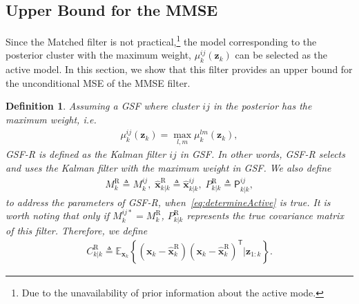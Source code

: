\documentclass[10pt,twocolumn,twoside]{IEEEtran}
\newtheorem{Def}{Definition}
\newcommand{\tran}{^{\mathsf{T}}}
\newcommand{\expectx}{\mathds{E}_{\mathbf{x}_k}\!}
\newcommand{\corcol}[1]{\textcolor{CorCol}{#1}}
\begin{document}
 
\subsection{Upper Bound for the MMSE}
\label{sec:UB}
Since the Matched filter is not practical,\footnote{Due to the unavailability of prior information about the active mode.} the model corresponding to the posterior cluster with the maximum weight, \(\mu_k^{ij}{\left(\mathbf{z}_{k}\right)}\) can be selected as the active model. In this section, we show that this filter provides an upper bound for the unconditional MSE of the MMSE filter.

\begin{Def}
\label{def:UBFilter}
Assuming a GSF where cluster \(ij\) in the posterior has the maximum weight, i.e.
\begin{align}
\label{eq:determineActive}
\mu_k^{ij}{\left(\mathbf{z}_{k}\right)} = \max_{l,m}\mu_k^{lm}{\left(\mathbf{z}_{k}\right)},
\end{align}
GSF-R is defined as the Kalman filter \(ij\) in GSF. In other words, GSF-R selects and uses the Kalman filter with the maximum weight in GSF. We also define
\begin{align}
M_k^{\mathrm{R}} \triangleq  M_k^{ij}, \;
\hat{\mathbf{x}}_{k|k}^{\mathrm{R}} \triangleq  \mathsf{\hat{\boldsymbol{x}}}_{k|k}^{ij}, \;
 P_{k|k}^{\mathrm{R}}  \triangleq  \mathsf{P}_{k|k}^{ij},
\end{align}
to address the parameters of GSF-R, when~\eqref{eq:determineActive} is true. \corcol{It is worth noting that only if \(M^{ij*}_k=M_k^{\mathrm{R}}\), \(P_{k|k}^{\mathrm{R}}\) represents the true covariance matrix of this filter. Therefore, we define}
\corcol{\begin{align}
C_{k|k}^{\mathrm{R}} \triangleq \expectx{\left\lbrace \left(\mathbf{x}_{k}-\hat{\mathbf{{x}}}_{k}^{\mathrm{R}}\right)\left(\mathbf{x}_{k}-\hat{\mathbf{{x}}}_{k}^{\mathrm{R}}\right)\tran \big| \mathbf{{z}}_{1:k} \right\rbrace }.
\end{align}}
\end{Def}
\end{document}
